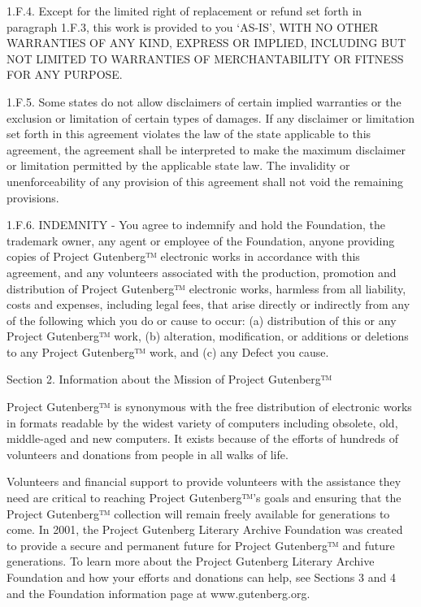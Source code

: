 1.F.4. Except for the limited right of replacement or refund set forth
in paragraph 1.F.3, this work is provided to you ‘AS-IS’, WITH NO
OTHER WARRANTIES OF ANY KIND, EXPRESS OR IMPLIED, INCLUDING BUT NOT
LIMITED TO WARRANTIES OF MERCHANTABILITY OR FITNESS FOR ANY PURPOSE.

1.F.5. Some states do not allow disclaimers of certain implied
warranties or the exclusion or limitation of certain types of
damages. If any disclaimer or limitation set forth in this agreement
violates the law of the state applicable to this agreement, the
agreement shall be interpreted to make the maximum disclaimer or
limitation permitted by the applicable state law. The invalidity or
unenforceability of any provision of this agreement shall not void the
remaining provisions.

1.F.6. INDEMNITY - You agree to indemnify and hold the Foundation, the
trademark owner, any agent or employee of the Foundation, anyone
providing copies of Project Gutenberg™ electronic works in
accordance with this agreement, and any volunteers associated with the
production, promotion and distribution of Project Gutenberg™
electronic works, harmless from all liability, costs and expenses,
including legal fees, that arise directly or indirectly from any of
the following which you do or cause to occur: (a) distribution of this
or any Project Gutenberg™ work, (b) alteration, modification, or
additions or deletions to any Project Gutenberg™ work, and (c) any
Defect you cause.

Section 2. Information about the Mission of Project Gutenberg™

Project Gutenberg™ is synonymous with the free distribution of
electronic works in formats readable by the widest variety of
computers including obsolete, old, middle-aged and new computers. It
exists because of the efforts of hundreds of volunteers and donations
from people in all walks of life.

Volunteers and financial support to provide volunteers with the
assistance they need are critical to reaching Project Gutenberg™’s
goals and ensuring that the Project Gutenberg™ collection will
remain freely available for generations to come. In 2001, the Project
Gutenberg Literary Archive Foundation was created to provide a secure
and permanent future for Project Gutenberg™ and future
generations. To learn more about the Project Gutenberg Literary
Archive Foundation and how your efforts and donations can help, see
Sections 3 and 4 and the Foundation information page at www.gutenberg.org.

